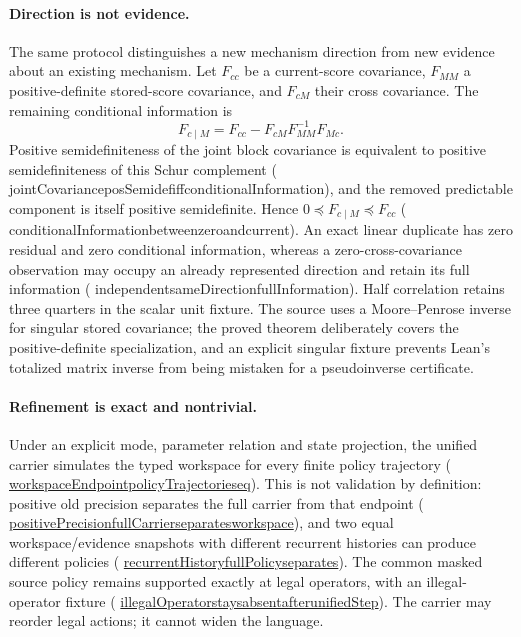 \documentclass[11pt]{article}
\newcommand{\leanname}[1]{{\scriptsize\ttfamily
  \def\_{\textunderscore\allowbreak}#1}}
\newcommand{\formalcommit}{f3a31db36bb2f944312ee31c1d86c2758109e83a}
\newcommand{\leansource}[3]{%
  \href{https://github.com/zariuq/MeTTapedia/blob/\formalcommit/#1\#L#2}{\leanname{#3}}}
\begin{document}
\paragraph{Direction is not evidence.}
The same protocol distinguishes a new mechanism direction from new evidence
about an existing mechanism.  Let $F_{cc}$ be a current-score covariance,
$F_{MM}$ a positive-definite stored-score covariance, and $F_{cM}$ their cross
covariance.  The remaining conditional information is
\[
 F_{c\mid M}=F_{cc}-F_{cM}F_{MM}^{-1}F_{Mc}.
\]
Positive semidefiniteness of the joint block covariance is equivalent to
positive semidefiniteness of this Schur complement
(\leanname{jointCovariance\_posSemidef\_iff\_conditionalInformation}), and the
removed predictable component is itself positive semidefinite.  Hence
$0\preceq F_{c\mid M}\preceq F_{cc}$
(\leanname{conditionalInformation\_between\_zero\_and\_current}).
An exact linear duplicate has zero residual and zero conditional information,
whereas a zero-cross-covariance observation may occupy an already represented
direction and retain its full information
(\leanname{independent\_sameDirection\_fullInformation}).  Half
correlation retains three quarters in the scalar unit fixture.  The source
uses a Moore--Penrose inverse for singular stored covariance; the proved
theorem deliberately covers the positive-definite specialization, and an
explicit singular fixture prevents Lean's totalized matrix inverse from being
mistaken for a pseudoinverse certificate.

\paragraph{Refinement is exact and nontrivial.}
Under an explicit mode, parameter relation and state projection, the unified carrier
simulates the typed workspace for every finite policy trajectory
(\leansource{lean/mettapedia/Mettapedia/MachineLearning/NeuralNetworks/UnifiedCarrier/StateCarrier.lean}{246-L278}{workspaceEndpoint\_policyTrajectories\_eq}).
This is not validation by definition: positive old precision separates the full carrier
from that endpoint
(\leansource{lean/mettapedia/Mettapedia/MachineLearning/NeuralNetworks/UnifiedCarrier/StateCarrier.lean}{283-L292}{positivePrecision\_fullCarrier\_separates\_workspace}),
and two equal workspace/evidence snapshots with different recurrent histories can produce
different policies
(\leansource{lean/mettapedia/Mettapedia/MachineLearning/NeuralNetworks/UnifiedCarrier/StateCarrier.lean}{295-L303}{recurrentHistory\_fullPolicy\_separates}).
The common masked source policy remains supported exactly at legal operators, with an
illegal-operator fixture
(\leansource{lean/mettapedia/Mettapedia/MachineLearning/NeuralNetworks/UnifiedCarrier/StateCarrier.lean}{332-L339}{illegalOperator\_stays\_absent\_after\_unifiedStep}).
The carrier may reorder legal actions; it cannot widen the language.
\end{document}
